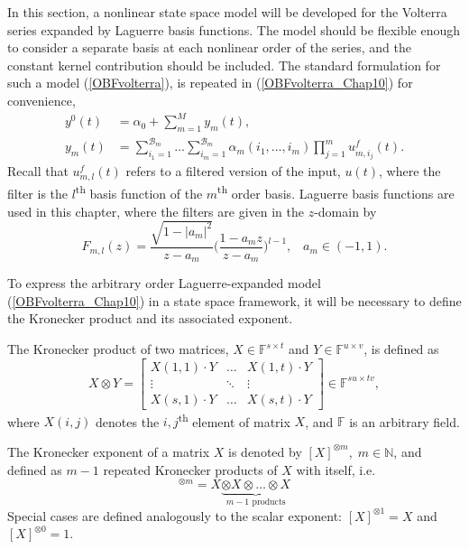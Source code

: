 In this section, a nonlinear state space model will be developed for the Volterra series expanded by Laguerre basis functions. The model should be flexible enough to consider a separate basis at each nonlinear order of the series, and the constant kernel contribution should be included. The standard formulation for such a model (\ref{OBFvolterra}), is repeated in (\ref{OBFvolterra_Chap10}) for convenience,
\begin{equation}
\begin{split}
\label{OBFvolterra_Chap10}
y^0(t) &= \alpha_0 + \sum_{m=1}^{M} y_m(t), \\
y_m(t) &= \sum_{i_1=1}^{\mathcal{B}_m} \hdots \sum_{i_m=1}^{\mathcal{B}_m} \alpha_m(i_1,\hdots,i_m) \prod_{j=1}^{m} u^f_{m,i_j}(t).
\end{split}
\end{equation}
Recall that $u^f_{m,l}(t)$ refers to a filtered version of the input, $u(t)$, where the filter is the $l$\textsuperscript{th} basis function of the $m$\textsuperscript{th} order basis. Laguerre basis functions are used in this chapter, where the filters are given in the $z$-domain by
\begin{equation}
\label{LBFdef_Chap10}
F_{m,l}(z) = \frac{\sqrt{1-|a_m|^2}}{z-a_m} \bigg( \frac{1-a_m z}{z-a_m} \bigg) ^{l-1}, \; \; \; a_m \in (-1,1).
\end{equation}

To express the arbitrary order Laguerre-expanded model (\ref{OBFvolterra_Chap10}) in a state space framework, it will be necessary to define the Kronecker product and its associated exponent.

\begin{defn}
The Kronecker product of two matrices, $X \in \mathbb{F}^{s \times t}$ and $Y \in \mathbb{F}^{u \times v}$, is defined as 
\begin{equation}
X \otimes Y = \begin{bmatrix} X(1,1) \cdot Y & \hdots & X(1,t) \cdot Y \\ \vdots & \ddots &\vdots \\ X(s,1) \cdot Y & \hdots & X(s,t) \cdot Y \end{bmatrix} \in \mathbb{F}^{su \times tv},
\end{equation}
where $X(i,j)$ denotes the $i,j$\textsuperscript{th} element of matrix $X$, and $\mathbb{F}$ is an arbitrary field.
\end{defn}

\begin{defn}
The Kronecker exponent of a matrix $X$ is denoted by $[X]^{\otimes m}, \; m \in \mathbb{N}$, and defined as $m-1$ repeated Kronecker products of $X$ with itself, i.e. 
\begin{equation}
[X]^{\otimes m} = X \underbrace{\otimes X \otimes \hdots \otimes X}_{m-1 \text{ products}}
\end{equation}
Special cases are defined analogously to the scalar exponent: $[X]^{\otimes 1} = X$ and $[X]^{\otimes 0} = 1$.
\end{defn}

